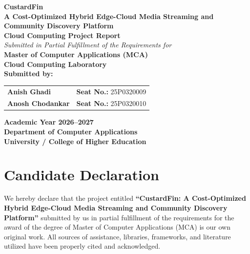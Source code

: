 
\begin{titlepage}
    \centering
    \vspace*{1cm}
    
    {\Huge \textbf{CustardFin}}\\[0.4cm]
    {\Large \textbf{A Cost-Optimized Hybrid Edge-Cloud Media Streaming and Community Discovery Platform}}\\[1.0cm]
    
    {\LARGE \textbf{Cloud Computing Project Report}}\\[1.2cm]
    
    \textit{Submitted in Partial Fulfillment of the Requirements for}\\[0.2cm]
    \textbf{Master of Computer Applications (MCA)}\\[0.2cm]
    \textbf{Cloud Computing Laboratory}\\[1.5cm]
    
    \textbf{Submitted by:}\\[0.4cm]
    \begin{tabular}{ll}
        \textbf{Anish Ghadi} & \quad \textbf{Seat No.:} 25P0320009 \\
        \textbf{Anosh Chodankar} & \quad \textbf{Seat No.:} 25P0320010 \\
    \end{tabular}
    
    \vfill
    
    \textbf{Academic Year 2026--2027}\\[0.2cm]
    \textbf{Department of Computer Applications}\\[0.2cm]
    \textbf{University / College of Higher Education}\\[1cm]
\end{titlepage}

\chapter*{Candidate Declaration}

We hereby declare that the project entitled \textbf{``CustardFin: A Cost-Optimized Hybrid Edge-Cloud Media Streaming and Community Discovery Platform''} submitted by us in partial fulfillment of the requirements for the award of the degree of Master of Computer Applications (MCA) is our own original work. All sources of assistance, libraries, frameworks, and literature utilized have been properly cited and acknowledged.

